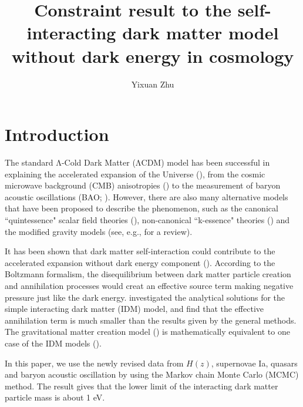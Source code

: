 \documentclass[twocolumn]{aastex631}
\begin{document}
 

   \title{Constraint result to the self-interacting dark matter model without dark energy
   in cosmology}

   \author{Yixuan Zhu}
 
   \begin{abstract}

   \end{abstract}
   
   \keywords{}

\section{Introduction}

   The standard Λ-Cold Dark Matter (ΛCDM) model has been successful in 
   explaining the accelerated expansion of the Universe (\cite{Riess_1998,Perlmutter_1999}), 
   from the cosmic microwave background (CMB) anisotropies (\cite{Bennett_1996}) to 
   the measurement of baryon acoustic oscillations (BAO; \cite{Eisenstein_2005}). 
   However, there are also many alternative models that have been proposed to describe 
   the phenomenon, such as the canonical ``quintessence" scalar field theories 
   (\cite{PhysRevD.37.3406, WETTERICH1988668,PhysRevLett.80.1582}),
   non-canonical ``k-essence" theories (\cite{PhysRevLett.85.4438, PhysRevD.63.103510})
   and the modified gravity models (see, e.g., \cite{CLIFTON20121} for a review).

   It has been shown that dark matter self-interaction could contribute 
   to the accelerated expansion without dark energy component (\cite{PhysRevD.64.063501, Balakin_2003}). 
   According to the Boltzmann formalism, the disequilibrium between dark matter particle
   creation and annihilation processes would creat an effective source term 
   making negative pressure just like the dark energy. \cite{Basilakos_2009}
   investigated the analytical solutions for the simple interacting dark matter (IDM) 
   model, and find that the effective annihilation term is much smaller than the
   results given by the general methods. The gravitational matter creation model (\cite{Lima_2008})
   is mathematically equivalent to one case of the IDM models (\cite{Basilakos_2009}).

   In this paper, we use the newly revised data from $H(z)$, supernovae Ia, 
   quasars and baryon acoustic oscillation by using the Markov chain Monte
   Carlo (MCMC) method. The result gives that the lower limit of the interacting
   dark matter particle mass is about 1 eV.
\end{document}
